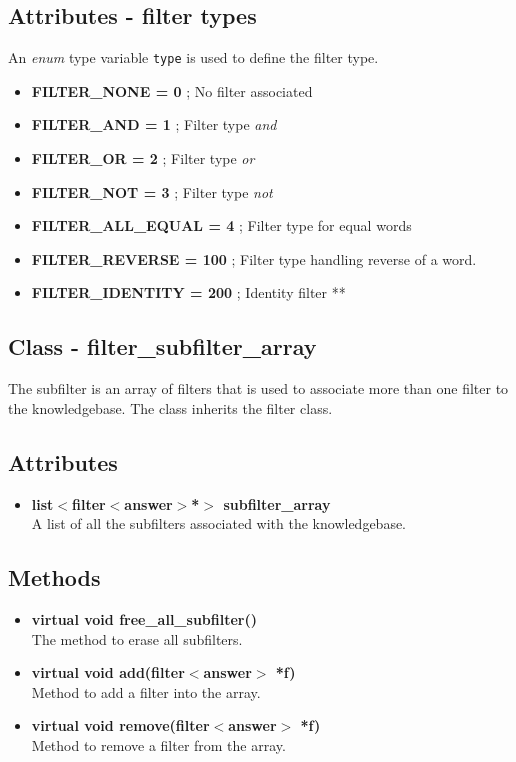 \subsection*{Attributes - filter types}
An \emph{enum} type variable \texttt{type} is used to define the filter type.
\begin{itemize}
 \item \textbf{FILTER\_NONE = 0} ; No filter associated
 \item \textbf{FILTER\_AND = 1} ; Filter type \emph{and}
 \item \textbf{FILTER\_OR = 2} ; Filter type \emph{or}
 \item \textbf{FILTER\_NOT = 3} ; Filter type \emph{not}
 \item \textbf{FILTER\_ALL\_EQUAL = 4} ; Filter type for equal words
 \item \textbf{FILTER\_REVERSE = 100} ; Filter type handling reverse of a word.
 \item \textbf{FILTER\_IDENTITY = 200} ; Identity filter **
\end{itemize}

\subsection{Class - filter\_subfilter\_array}
The subfilter is an array of filters that is used to associate more than one filter to the knowledgebase. The class inherits the filter class.
\subsection*{Attributes}
\begin{itemize}
 \item \textbf{list$<$filter$<$answer$>$*$>$ subfilter\_array} \\
	A list of all the subfilters associated with the knowledgebase.
\end{itemize}
\subsection*{Methods}
\begin{itemize}
 \item \textbf{virtual void free\_all\_subfilter()} \\
	The method to erase all subfilters.
 \item \textbf{virtual void add(filter$<$answer$>$ *f)} \\
	Method to add a filter into the array.
 \item \textbf{virtual void remove(filter$<$answer$>$ *f)} \\
	Method to remove a filter from the array.
\end{itemize}

